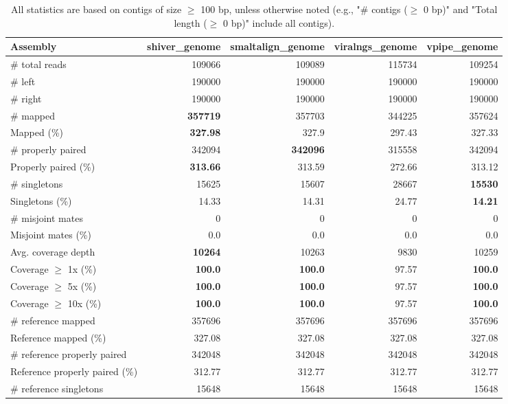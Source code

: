 \documentclass[12pt,a4paper]{article}
\begin{document}
\begin{table}[ht]
\begin{center}
\caption{All statistics are based on contigs of size $\geq$ 100 bp, unless otherwise noted (e.g., "\# contigs ($\geq$ 0 bp)" and "Total length ($\geq$ 0 bp)" include all contigs).}
\begin{tabular}{|l*{4}{|r}|}
\hline
Assembly & shiver\_genome & smaltalign\_genome & viralngs\_genome & vpipe\_genome \\ \hline
\# total reads & 109066 & 109089 & 115734 & 109254 \\ \hline
\# left & 190000 & 190000 & 190000 & 190000 \\ \hline
\# right & 190000 & 190000 & 190000 & 190000 \\ \hline
\# mapped & {\bf 357719} & 357703 & 344225 & 357624 \\ \hline
Mapped (\%) & {\bf 327.98} & 327.9 & 297.43 & 327.33 \\ \hline
\# properly paired & 342094 & {\bf 342096} & 315558 & 342094 \\ \hline
Properly paired (\%) & {\bf 313.66} & 313.59 & 272.66 & 313.12 \\ \hline
\# singletons & 15625 & 15607 & 28667 & {\bf 15530} \\ \hline
Singletons (\%) & 14.33 & 14.31 & 24.77 & {\bf 14.21} \\ \hline
\# misjoint mates & 0 & 0 & 0 & 0 \\ \hline
Misjoint mates (\%) & 0.0 & 0.0 & 0.0 & 0.0 \\ \hline
Avg. coverage depth & {\bf 10264} & 10263 & 9830 & 10259 \\ \hline
Coverage $\geq$ 1x (\%) & {\bf 100.0} & {\bf 100.0} & 97.57 & {\bf 100.0} \\ \hline
Coverage $\geq$ 5x (\%) & {\bf 100.0} & {\bf 100.0} & 97.57 & {\bf 100.0} \\ \hline
Coverage $\geq$ 10x (\%) & {\bf 100.0} & {\bf 100.0} & 97.57 & {\bf 100.0} \\ \hline
\# reference mapped & 357696 & 357696 & 357696 & 357696 \\ \hline
Reference mapped (\%) & 327.08 & 327.08 & 327.08 & 327.08 \\ \hline
\# reference properly paired & 342048 & 342048 & 342048 & 342048 \\ \hline
Reference properly paired (\%) & 312.77 & 312.77 & 312.77 & 312.77 \\ \hline
\# reference singletons & 15648 & 15648 & 15648 & 15648 \\ \hline

\end{tabular}
\end{center}
\end{table}
\end{document}
